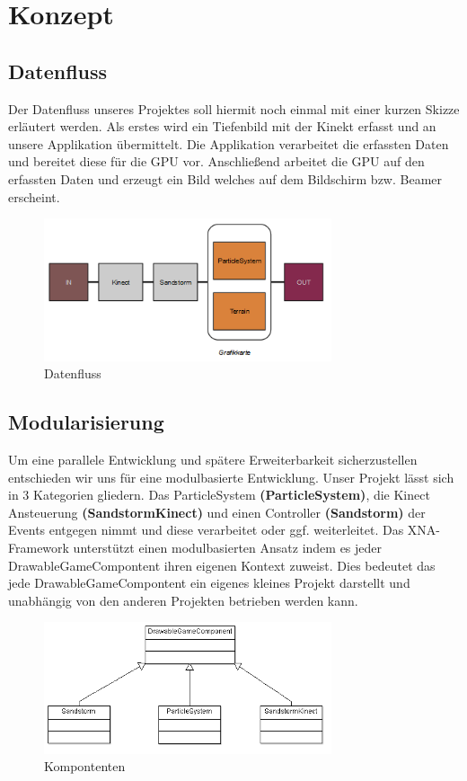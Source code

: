\chapter{Konzept}
\begin{Spacing}{\mylinespace}

\section{Datenfluss}
Der Datenfluss unseres Projektes soll hiermit noch einmal mit einer kurzen Skizze erläutert werden.
Als erstes wird ein Tiefenbild mit der Kinekt erfasst und an unsere Applikation übermittelt.
Die Applikation verarbeitet die erfassten Daten und bereitet diese für die GPU vor.
Anschließend arbeitet die GPU auf den erfassten Daten und erzeugt ein Bild welches auf dem Bildschirm bzw. Beamer erscheint.
\begin{figure}[h!]
	\centering
	\vspace*{20px}
	\includegraphics[width=320px]{graphics/flow.png}
	\caption{Datenfluss}
	\label{fig:dataFlow}
\end{figure}

\section{Modularisierung}
Um eine parallele Entwicklung und spätere Erweiterbarkeit sicherzustellen entschieden wir uns für eine modulbasierte Entwicklung.
Unser Projekt lässt sich in 3 Kategorien gliedern. Das ParticleSystem \textbf{(ParticleSystem)}, die Kinect Ansteuerung \textbf{(SandstormKinect)} und einen Controller \textbf{(Sandstorm)} der Events entgegen nimmt und diese verarbeitet oder ggf. weiterleitet.
Das XNA-Framework unterstützt einen modulbasierten Ansatz indem es jeder DrawableGameCompontent ihren eigenen Kontext zuweist.
Dies bedeutet das jede DrawableGameCompontent ein eigenes kleines Projekt darstellt und unabhängig von den anderen Projekten betrieben werden kann.
\begin{figure}[h!]
	\centering
	\vspace*{20px}
	\includegraphics[width=320px]{graphics/DrawableGame.png}
	\caption{Kompontenten}
	\label{fig:singleColor}
\end{figure}


\end{Spacing}
